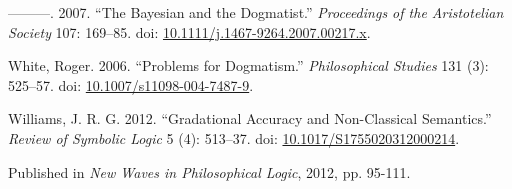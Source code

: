 \documentclass[
  10pt,
  letterpaper,
  DIV=11,
  numbers=noendperiod,
  twoside]{scrartcl}
\newlength{\cslhangindent}
\newenvironment{CSLReferences}[2] %
 {\begin{list}{}{%
  \setlength{\itemindent}{0pt}
  \setlength{\leftmargin}{0pt}
  \setlength{\parsep}{0pt}
  \ifodd #1
   \setlength{\leftmargin}{\cslhangindent}
   \setlength{\itemindent}{-1\cslhangindent}
  \fi
  \setlength{\itemsep}{#2\baselineskip}}}
 {\end{list}}
\begin{document}
\begin{CSLReferences}{1}{0}
---------. 2007. {``The Bayesian and the Dogmatist.''} \emph{Proceedings
of the Aristotelian Society} 107: 169--85. doi:
\href{https://doi.org/10.1111/j.1467-9264.2007.00217.x}{10.1111/j.1467-9264.2007.00217.x}.

White, Roger. 2006. {``Problems for Dogmatism.''} \emph{Philosophical
Studies} 131 (3): 525--57. doi:
\href{https://doi.org/10.1007/s11098-004-7487-9}{10.1007/s11098-004-7487-9}.

Williams, J. R. G. 2012. {``Gradational Accuracy and Non-Classical
Semantics.''} \emph{Review of Symbolic Logic} 5 (4): 513--37. doi:
\href{https://doi.org/10.1017/S1755020312000214}{10.1017/S1755020312000214}.

\end{CSLReferences}



\noindent Published in\emph{
New Waves in Philosophical Logic}, 2012, pp. 95-111.
\end{document}
